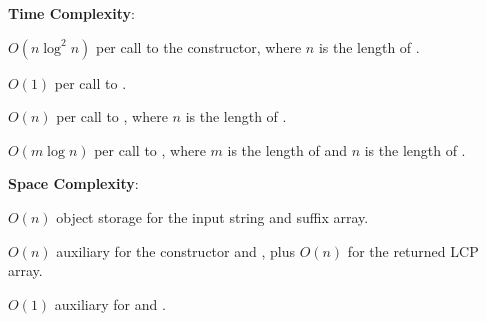 \textbf{Time Complexity}:
\begin{compactitem}
  \item $O(n \log^{2} n)$ per call to the constructor, where $n$ is the length of .
  \item $O(1)$ per call to .
  \item $O(n)$ per call to , where $n$ is the length of .
  \item $O(m \log n)$ per call to , where $m$ is the length of  and $n$ is the length of .
\end{compactitem}

\textbf{Space Complexity}:
\begin{compactitem}
  \item $O(n)$ object storage for the input string and suffix array.
  \item $O(n)$ auxiliary for the constructor and , plus $O(n)$ for the returned LCP array.
  \item $O(1)$ auxiliary for  and .
\end{compactitem}

